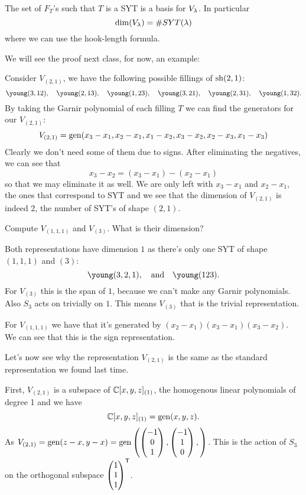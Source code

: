 \documentclass[12pt]{memoir}
\begin{document}
\begin{Prop}
    The set of $F_T$'s such that $T$ is a SYT is a basis for $V_\lambda$. In particular 
    $$\dim(V_\lambda)=\# SYT(\lambda)$$
    where we can use the hook-length formula. 
\end{Prop}

We will see the proof next class, for now, an example:

\begin{Ex}
    Consider $V_{(2,1)}$, we have the following possible fillings of $\operatorname{sh}(2,1)$:
    $$\young(3,12),\quad\young(2,13),\quad\young(1,23),\quad\young(3,21),\quad\young(2,31),\quad\young(1,32).$$
    By taking the Garnir polynomial of each filling $T$ we can find the generators for our $V_{(2,1)}$:
    $$V_{(2,1)}=\operatorname{gen}(x_3-x_1,x_2-x_1,x_1-x_2,x_3-x_2,x_2-x_3,x_1-x_3)$$
    Clearly we don't need some of them due to signs. After eliminating the negatives, we can see that 
    $$x_3-x_2=(x_3-x_1)-(x_2-x_1)$$
    so that we may eliminate it as well. We are only left with $x_3-x_1$ and $x_2-x_1$, the ones that correspond to SYT and we see that the dimension of $V_{(2,1)}$ is indeed 2, the number of SYT's of shape $(2,1)$.
\end{Ex}

\begin{Ej}
    Compute $V_{(1,1,1)}$ and $V_{(3)}$. What is their dimension? 
\end{Ej}

\begin{ptcbr}
    Both representations have dimension $1$ as there's only one SYT of shape $(1,1,1)$ and $(3)$:
    $$\young(3,2,1),\word{and}\young(123).$$ 
    For $V_{(3)}$ this is the span of $1$, because we can't make any Garnir polynomials. Also $S_3$ acts on trivially on $1$. This means $V_{(3)}$ that is the trivial representation.\par 
    For $V_{(1,1,1)}$ we have that it's generated by $(x_2-x_1)(x_3-x_1)(x_3-x_2)$. We can see that this is the sign representation.
\end{ptcbr}

Let's now see why the representation $V_{(2,1)}$ is the same as the standard representation we found last time.\par 
First, $V_{(2,1)}$ is a subspace of $\mathbb{C}[x,y,z]_{(1)}$, the homogenous linear polynomials of degree 1 and we have
$$\mathbb{C}[x,y,z]_{(1)}=\operatorname{gen}(x,y,z).$$
As $V_{(2,1)}=\operatorname{gen}(z-x,y-x)=\operatorname{gen}\left(\begin{pmatrix} -1 \\ 0 \\ 1 \end{pmatrix},\begin{pmatrix} -1 \\ 1 \\ 0 \end{pmatrix},\right)$. This is the action of $S_3$ on the orthogonal subspace $\begin{pmatrix} 1 \\ 1 \\ 1 \end{pmatrix}^{\mathsf{T}}$.
\end{document}
